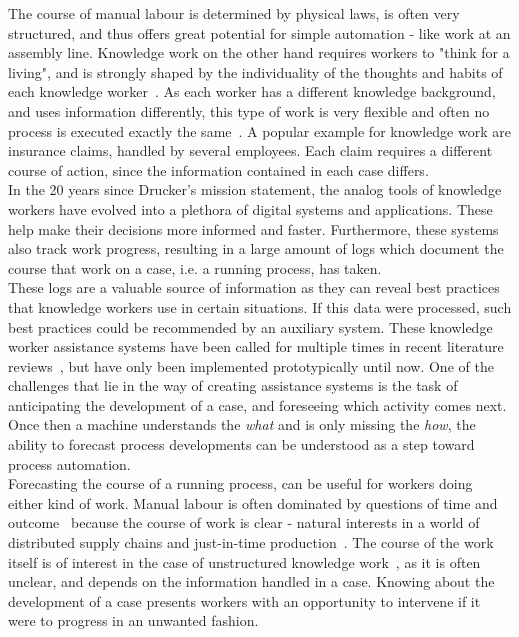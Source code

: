 The course of manual labour is determined by physical laws, is often very structured, and thus offers great potential for simple automation - like work at an assembly line. Knowledge work on the other hand requires workers to "think for a living", and is strongly shaped by the individuality of the thoughts and habits of each knowledge worker~\cite{drucker1999}. As each worker has a different knowledge background, and uses information differently, this type of work is very flexible and often no process is executed exactly the same~\cite{hewelt2016}. A popular example for knowledge work are insurance claims, handled by several employees. Each claim requires a different course of action, since the information contained in each case differs.\\

In the 20 years since Drucker's mission statement, the analog tools of knowledge workers have evolved into a plethora of digital systems and applications. These help make their decisions more informed and faster. Furthermore, these systems also track work progress, resulting in a large amount of logs which document the course that work on a case, i.e. a running process, has taken.\\

These logs are a valuable source of information as they can reveal best practices that knowledge workers use in certain situations. If this data were processed, such best practices could be recommended by an auxiliary system. These knowledge worker assistance systems have been called for multiple times in recent literature reviews~\cite{hauder2014, francescomarino2018}, but have only been implemented prototypically until now. One of the challenges that lie in the way of creating assistance systems is the task of anticipating the development of a case, and foreseeing which activity comes next. Once then a machine understands the \textit{what} and is only missing the \textit{how}, the ability to forecast process developments can be understood as a step toward process automation.\\

Forecasting the course of a running process, can be useful for workers doing either kind of work. Manual labour is often dominated by questions of time and outcome~\cite{rogge2013} because the course of work is clear - natural interests in a world of distributed supply chains and just-in-time production~\cite{web:economist:jit}. The course of the work itself is of interest in the case of unstructured knowledge work~\cite{francescomarino2015}, as it is often unclear, and depends on the information handled in a case. Knowing about the development of a case presents workers with an opportunity to intervene if it were to progress in an unwanted fashion.\\

